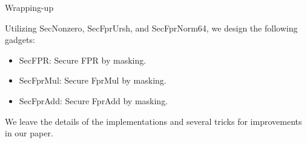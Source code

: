 \begin{frame}{Wrapping-up}

Utilizing {\sf SecNonzero}, {\sf SecFprUrsh}, and {\sf SecFprNorm64}, we design the following gadgets:
\pause
\begin{itemize}
	\item {\sf SecFPR}: Secure FPR by masking.
	\pause
	\item {\sf SecFprMul}: Secure FprMul by masking.
	\pause
	\item {\sf SecFprAdd}: Secure FprAdd by masking.
\end{itemize}
\pause
We leave the details of the implementations and several tricks for improvements in our paper.
\end{frame}
